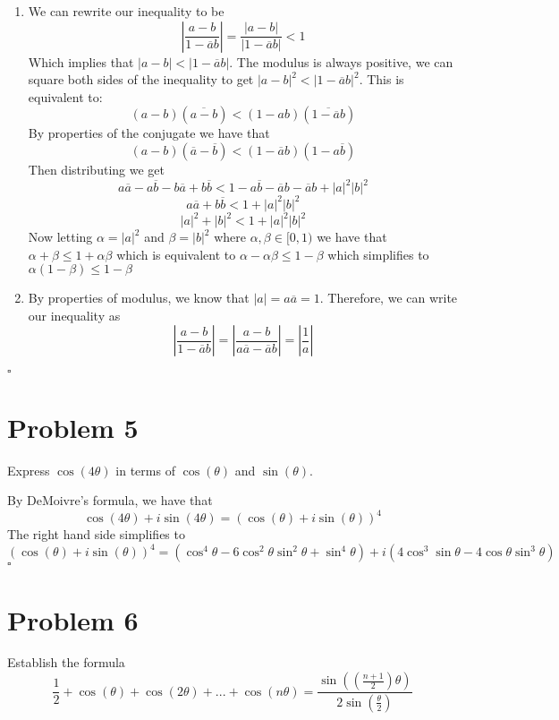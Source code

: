 \documentclass[12pt]{article}
\newenvironment{proof}{\noindent{\bf Proof.}}{\hfill $\square$\medskip}
\begin{document}
\begin{proof}
\begin{enumerate}[label=\textbf{(\alph*)}]
    \item We can rewrite our inequality to be
    $$\left|\frac{a-b}{1-\overline{a}{b}}\right|=\frac{|a-b|}{|1-\overline{a}b|}<1$$
    Which implies that $|a-b|<|1-\overline{a}b|$. The modulus is always positive, we can square both sides of the inequality to get $|a-b|^{2}<|1-\overline{a}b|^{2}$. This is equivalent to:
    $$(a-b)(\overline{a-b})<(1-ab)(\overline{1-\overline{a}b})$$
    By properties of the conjugate we have that
    $$(a-b)(\overline{a}-\overline{b})<(1-\overline{a}b)(1-a\overline{b})$$
    Then distributing we get
    $$a\overline{a}-a\overline{b}-b\overline{a}+b\overline{b}<1-a\overline{b}-\overline{a}b-\overline{a}b+|a|^{2}|b|^{2}$$
    $$a\overline{a}+b\overline{b}<1+|a|^{2}|b|^{2}$$
    $$|a|^{2}+|b|^{2}<1+|a|^{2}|b|^{2}$$
    Now letting $\alpha=|a|^{2}$ and $\beta=|b|^{2}$ where $\alpha,\beta \in [0,1)$ we have that $\alpha+\beta\leq 1+\alpha\beta$ which is equivalent to $\alpha-\alpha\beta\leq 1-\beta$ which simplifies to $\alpha(1-\beta)\leq 1-\beta$
    \item By properties of modulus, we know that $|a|=a\overline{a}=1$. Therefore, we can write our inequality as $$\left|\frac{a-b}{1-\overline{a}b}\right|=\left|\frac{a-b}{a\overline{a}-\overline{a}b}\right|=\left|\frac{1}{a}\right |$$
\end{enumerate}
\end{proof}


\section{Problem 5}
Express $\cos(4\theta)$ in terms of $\cos(\theta)$ and $\sin(\theta)$.

\begin{proof}
By DeMoivre's formula, we have that
$$\cos(4\theta)+i\sin(4\theta)=(\cos(\theta)+i\sin(\theta))^{4}$$
The right hand side simplifies to
$$(\cos(\theta)+i\sin(\theta))^{4}=(\cos^{4}\theta-6\cos^{2}\theta\sin^{2}\theta+\sin^{4}\theta)+i(4\cos^{3}\sin\theta-4\cos\theta\sin^{3}\theta)$$
\end{proof}


\newpage
\section{Problem 6}
Establish the formula
$$\frac{1}{2}+\cos(\theta)+\cos(2\theta)+...+\cos(n\theta)=\frac{\sin((\frac{n+1}{2})\theta)}{2\sin(\frac{\theta}{2})}$$
\end{document}
